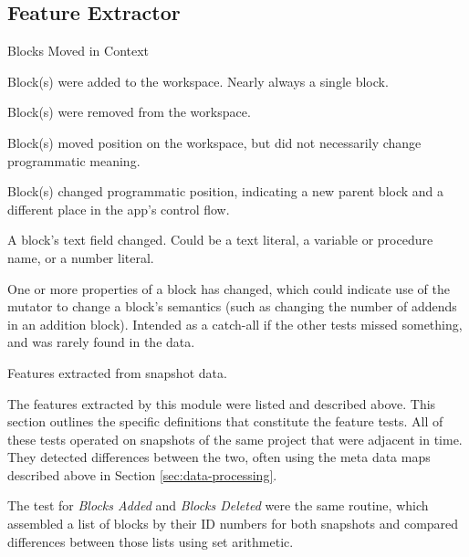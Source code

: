 \subsection{Feature Extractor}
\label{sec:feature-extraction}

\begin{table}
\begin{labeling}{Blocks Moved in Context}

	\item [Blocks Added] Block(s) were added to the workspace. Nearly always a single block.
	\item [Blocks Deleted] Block(s) were removed from the workspace.
	\item [Blocks Moved in Space] Block(s) moved position on the workspace, but did not necessarily change programmatic meaning.
	\item [Blocks Moved in Context] Block(s) changed programmatic position, indicating a new parent block and a different place in the app's control flow.
	\item [Fields Changed] A block's text field changed. Could be a text literal, a variable or procedure name, or a number literal.
	\item [Properties Modified] One or more properties of a block has changed, which could indicate use of the mutator to change a block's semantics (such as changing the number of addends in an addition block). Intended as a catch-all if the other tests missed something, and was rarely found in the data.
	
\end{labeling}
\caption[Features Extracted from Snapshots]{Features extracted from snapshot data.}
\label{tab:features-extracted}
\end{table}

The features extracted by this module were listed and described above. %
This section outlines the specific definitions that constitute the feature tests. All of these tests operated on snapshots of the same project that were adjacent in time. 
They detected differences between the two, often using the meta data maps described above in Section \ref{sec:data-processing}. 

The test for \emph{Blocks Added} and \emph{Blocks Deleted} were the same routine, which assembled a list of blocks by their ID numbers for both snapshots and compared differences between those lists using set arithmetic. 


